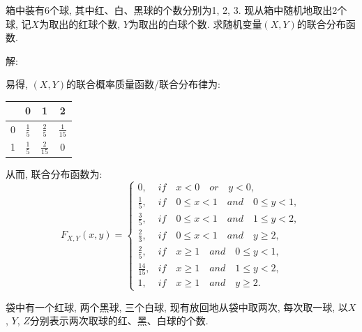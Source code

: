 \documentclass[standard]{ExBook}
\begin{document}
\begin{qitems}
    \begin{bbox}
    \begin{shaded}
        \qitem 
箱中装有6个球, 其中红、白、黑球的个数分别为1, 2, 3. 现从箱中随机地取出2个球, 记$X$为取出的红球个数, $Y$为取出的白球个数. 求随机变量$(X,Y)$的联合分布函数.
    \end{shaded}
    \end{bbox}

\vspace{-5em}

    \begin{bbox}
解: 

易得, $(X,Y)$的联合概率质量函数/联合分布律为:
\begin{footnotesize}
\begin{center}
    \renewcommand{\arraystretch}{1.5}
    \setlength{\tabcolsep}{20pt}
    \begin{tabular}{c|c|c|c}
	    \hline
	    \diagbox{$X$}{$P(X,Y)$}{$Y$} & 0 & 1 & 2 \\
	    \hline
	    0 & $\displaystyle\frac{1}{5}$ & $\displaystyle\frac{2}{5}$ & $\displaystyle\frac{1}{15}$\\
	    \hline
	    1 & $\displaystyle\frac{1}{5}$ & $\displaystyle\frac{2}{15}$ & 0\\
	    \hline
    \end{tabular}
\end{center}
\end{footnotesize}
从而, 联合分布函数为:
\[
F_{X,Y}(x, y) = 
\begin{cases} 
0, & if\quad x < 0\quad or\quad y < 0, \\ 
\frac{1}{5}, & if\quad 0 \leq x < 1\quad and\quad 0 \leq y < 1, \\ 
\frac{3}{5}, & if\quad 0 \leq x < 1\quad and\quad 1 \leq y < 2, \\ 
\frac{2}{3}, & if\quad 0 \leq x < 1\quad and\quad y \geq 2, \\ 
\frac{2}{5}, & if\quad x \geq 1\quad and\quad 0 \leq y < 1, \\ 
\frac{14}{15}, & if\quad x \geq 1\quad and\quad 1 \leq y < 2, \\ 
1, & if\quad x \geq 1\quad and\quad y \geq 2. 
\end{cases}
\]
    \end{bbox}

\vspace{-5em}

    \begin{bbox}
    \begin{shaded}
        \qitem
袋中有一个红球, 两个黑球, 三个白球, 现有放回地从袋中取两次, 每次取一球, 以$X$, $Y$, $Z$分别表示两次取球的红、黑、白球的个数.


\end{shaded}
\end{bbox}
\end{qitems}
\end{document}
